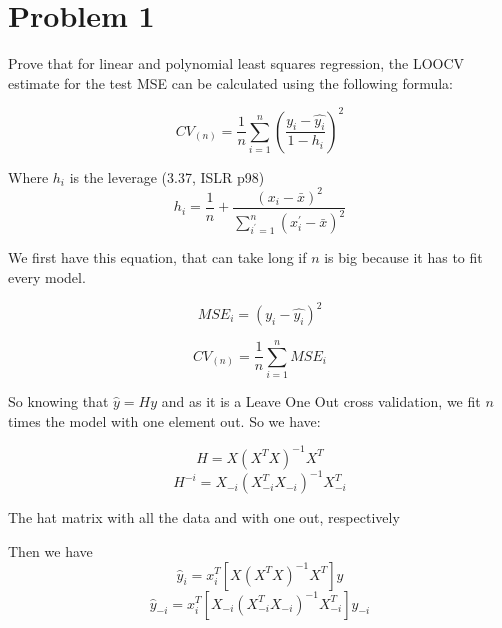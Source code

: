 \section*{Problem 1}


\noindent Prove that for linear and polynomial least squares regression, the LOOCV estimate for the test MSE can be calculated using the following formula: 


\begin{equation}
\label{LOOCV_shortcut}
CV_{(n)} = \frac{1}{n} \sum_{i = 1}^{n}\left( \frac{y_i - \hat{y_i}}{1 - h_i} \right)^2
\end{equation}

\noindent Where $ h_i $ is the leverage (3.37, ISLR p98)
\begin{equation}
\label{leverage}
h_i = \frac{1}{n} + \frac{(x_i - \bar{x})^2}{\sum_{i^{'} = 1}^{n} (x_i^{'} - \bar{x})^2}
\end{equation}


\noindent We first have this equation, that can take long if $n$ is big because it has to fit every model.

\[ MSE_i = (y_i - \hat{y_i})^2 \]

\[ CV_{(n)} = \frac{1}{n} \sum_{i = 1}^{n} MSE_i \]









\noindent So knowing that $ \hat{y} = Hy $ and as it is a Leave One Out cross validation, we fit $ n $ times the model with one element out. So we have:


\[ H = X(X^T X)^{-1} X^T \]
\[ H^{-i} = X_{-i}(X^T_{-i} X_{-i})^{-1} X^T_{-i} \]

\noindent The hat matrix with all the data and with one out, respectively

\noindent Then we have
\[ \hat{y}_i = x_i^T [X(X^T X)^{-1} X^T]y \] 
\[ \hat{y}_{-i} = x_i^T [X_{-i}(X_{-i}^T X_{-i})^{-1} X_{-i}^T]y_{-i} \]

